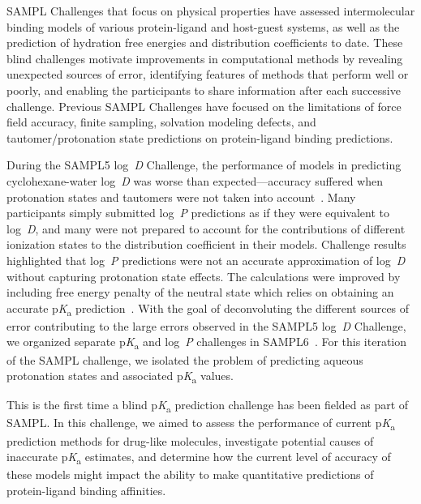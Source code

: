 \documentclass[9pt,lineno,final]{elife}
\newcommand{\pKa}{p\textit{K}\textsubscript{a}}
\newcommand{\logD}{log~\textit{D}}
\newcommand{\logP}{log~\textit{P}}
\begin{document}
SAMPL Challenges that focus on physical properties have assessed intermolecular binding models of various protein-ligand and host-guest systems, as well as the prediction of hydration free energies and distribution coefficients to date. 
These blind challenges motivate improvements in computational methods by revealing unexpected sources of error, identifying features of methods that perform well or poorly, and enabling the participants to share information after each successive challenge.
Previous SAMPL Challenges have focused on the limitations of force field accuracy, finite sampling, solvation modeling defects, and tautomer/protonation state predictions on protein-ligand binding predictions.  

During the SAMPL5 \logD{} Challenge, the performance of models in predicting cyclohexane-water \logD{} was worse than expected---accuracy suffered when protonation states and tautomers were not taken into account~\citep{Pickard:2016:J.Comput.AidedMol.Des., Bannan:2018:J.Comput.AidedMol.Des.}. 
Many participants simply submitted \logP{} predictions as if they were equivalent to \logD{}, and many were not prepared to account for the contributions of different ionization states to the distribution coefficient in their models. 
Challenge results highlighted that \logP{} predictions were not an accurate approximation of \logD{} without capturing protonation state effects.
The calculations were improved by including free energy penalty of the neutral state which relies on obtaining an accurate \pKa{} prediction~\citep{Pickard:2016:J.Comput.AidedMol.Des.}.
With the goal of deconvoluting the different sources of error contributing to the large errors observed in the SAMPL5 \logD{} Challenge, we organized separate \pKa{} and \logP{} challenges in SAMPL6~\citep{Isik:2018:J.Comput.AidedMol.Des., Isik:2020:J.Comput.AidedMol.Des., Isik:2020:J.Comput.AidedMol.Des.a}. 
For this iteration of the SAMPL challenge, we isolated the problem of predicting aqueous protonation states and associated \pKa{} values. 

This is the first time a blind \pKa{} prediction challenge has been fielded as part of SAMPL. 
In this challenge, we aimed to assess the performance of current \pKa{} prediction methods for drug-like molecules, investigate potential causes of inaccurate \pKa{} estimates, and determine how the current level of accuracy of these models might impact the ability to make quantitative predictions of protein-ligand binding affinities. 
\end{document}
